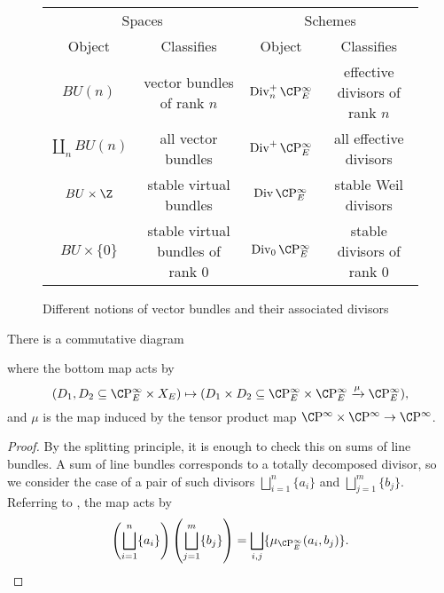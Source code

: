 \begin{figure}
\begin{center}
\begin{tabular}{@{}cccc@{}} \toprule
\multicolumn{2}{c}{Spaces} &
\multicolumn{2}{c}{Schemes}
\\
\cmidrule(r){1-2}
\cmidrule(r){3-4}
Object & Classifies & Object & Classifies \\ \midrule
$BU(n)$ & vector bundles of rank $n$ & $\Div_n^+ \CP^\infty_E$ & effective divisors of rank $n$ \\
$\coprod_n BU(n)$ & all vector bundles & $\Div^+ \CP^\infty_E$ & all effective divisors \\
$BU \times \Z$ & stable virtual bundles & $\Div \CP^\infty_E$ & stable Weil divisors \\
$BU \times \{0\}$ & stable virtual bundles of rank $0$ & $\Div_0 \CP^\infty_E$ & stable divisors of rank $0$ \\ \bottomrule
\end{tabular}
\end{center}
\caption{Different notions of vector bundles and their associated divisors}
\end{figure}

\begin{corollary}\label{ProductMapOfDivisorSchemes}
There is a commutative diagram
\begin{center}
\end{center}
where the bottom map acts by \[(D_1, D_2 \subseteq \CP^\infty_E \times X_E) \mapsto (D_1 \times D_2 \subseteq \CP^\infty_E \times \CP^\infty_E \xrightarrow{\mu} \CP^\infty_E),\] and $\mu$ is the map induced by the tensor product map $\CP^\infty \times \CP^\infty \to \CP^\infty$.
\end{corollary}
\begin{proof}
By the splitting principle, it is enough to check this on sums of line bundles.  A sum of line bundles corresponds to a totally decomposed divisor, so we consider the case of a pair of such divisors $\bigsqcup_{i=1}^n \{a_i\}$ and $\bigsqcup_{j=1}^m \{b_j\}$.  Referring to , the map acts by \[\left(\bigsqcup_{i=1}^n \{a_i\} \right) \left( \bigsqcup_{j=1}^m \{b_j\} \right) = \bigsqcup_{i, j} \{\mu_{\CP^\infty_E}(a_i, b_j)\}. \qedhere\]
\end{proof}

